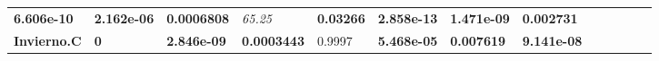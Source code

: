 \documentclass[]{book}
\theoremstyle{definition}
\theoremstyle{definition}
\theoremstyle{definition}
\theoremstyle{remark}
\begin{document}
\begin{longtable}[]{@{}lllllllllllll@{}}
\begin{minipage}[t]{0.05\columnwidth}
\textbf{6.606e-10}\strut
\end{minipage} & \begin{minipage}[t]{0.05\columnwidth}\raggedright
\textbf{2.162e-06}\strut
\end{minipage} & \begin{minipage}[t]{0.06\columnwidth}\raggedright
\textbf{0.0006808}\strut
\end{minipage} & \begin{minipage}[t]{0.05\columnwidth}\raggedright
\emph{65.25}\strut
\end{minipage} & \begin{minipage}[t]{0.05\columnwidth}\raggedright
\textbf{0.03266}\strut
\end{minipage} & \begin{minipage}[t]{0.05\columnwidth}\raggedright
\textbf{2.858e-13}\strut
\end{minipage} & \begin{minipage}[t]{0.06\columnwidth}\raggedright
\textbf{1.471e-09}\strut
\end{minipage} & \begin{minipage}[t]{0.05\columnwidth}\raggedright
\textbf{0.002731}\strut
\end{minipage}\tabularnewline
\begin{minipage}[t]{0.06\columnwidth}\raggedright
\textbf{Invierno.C}\strut
\end{minipage} & \begin{minipage}[t]{0.05\columnwidth}\raggedright
\textbf{0}\strut
\end{minipage} & \begin{minipage}[t]{0.05\columnwidth}\raggedright
\textbf{2.846e-09}\strut
\end{minipage} & \begin{minipage}[t]{0.06\columnwidth}\raggedright
\textbf{0.0003443}\strut
\end{minipage} & \begin{minipage}[t]{0.05\columnwidth}\raggedright
0.9997\strut
\end{minipage} & \begin{minipage}[t]{0.05\columnwidth}\raggedright
\textbf{5.468e-05}\strut
\end{minipage} & \begin{minipage}[t]{0.05\columnwidth}\raggedright
\textbf{0.007619}\strut
\end{minipage} & \begin{minipage}[t]{0.06\columnwidth}\raggedright
\textbf{9.141e-08}\strut
\end{minipage} & \begin{minipage}[t]{0.05\columnwidth}\raggedright

\end{minipage}
\end{longtable}
\end{document}
